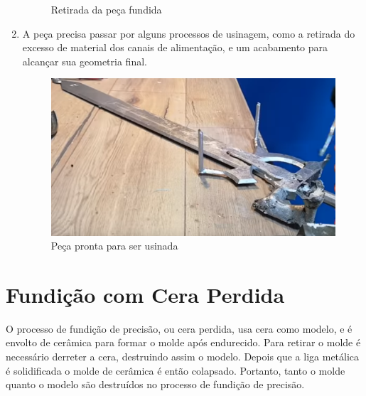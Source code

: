 \documentclass[a4paper, 12pt]{article}
\begin{document}
\begin{enumerate}
\begin{figure}[h]
			\caption{Retirada da peça fundida}
		\end{figure}
		\item A peça precisa passar por alguns processos de usinagem, como a retirada do excesso de material dos canais de alimentação, e um acabamento para alcançar sua geometria final. 
		\begin{figure}[h]
			\centering
			\includegraphics[scale=0.5]{a4.png}
			\caption{Peça pronta para ser usinada}
		\end{figure}
	\end{enumerate}
	
	\newpage
	\section{Fundição com Cera Perdida}
		O processo de fundição de precisão, ou cera perdida, usa cera como modelo, e é envolto de cerâmica para formar o molde após endurecido. Para retirar o molde é necessário derreter a cera, destruindo assim o modelo. Depois que a liga metálica é solidificada o molde de cerâmica é então colapsado. Portanto, tanto o molde quanto o modelo são destruídos no processo de fundição de precisão.
		
\end{document}
